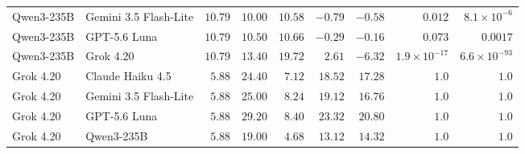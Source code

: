 \begin{table}[!htbp]
\begin{tabular}{@{}llrrrrrrr@{}}
Qwen3-235B & Gemini 3.5 Flash-Lite & $10.79$ & $10.00$ & $10.58$ & $-0.79$ & $-0.58$ & $0.012$ & $8.1\times10^{-6}$ \\
Qwen3-235B & GPT-5.6 Luna & $10.79$ & $10.50$ & $10.66$ & $-0.29$ & $-0.16$ & $0.073$ & $0.0017$ \\
Qwen3-235B & Grok 4.20 & $10.79$ & $13.40$ & $19.72$ & $2.61$ & $-6.32$ & $1.9\times10^{-17}$ & $6.6\times10^{-93}$ \\
\addlinespace[2pt]
Grok 4.20 & Claude Haiku 4.5 & $5.88$ & $24.40$ & $7.12$ & $18.52$ & $17.28$ & $1.0$ & $1.0$ \\
Grok 4.20 & Gemini 3.5 Flash-Lite & $5.88$ & $25.00$ & $8.24$ & $19.12$ & $16.76$ & $1.0$ & $1.0$ \\
Grok 4.20 & GPT-5.6 Luna & $5.88$ & $29.20$ & $8.40$ & $23.32$ & $20.80$ & $1.0$ & $1.0$ \\
Grok 4.20 & Qwen3-235B & $5.88$ & $19.00$ & $4.68$ & $13.12$ & $14.32$ & $1.0$ & $1.0$ \\
\bottomrule
\end{tabular}
\end{table}


